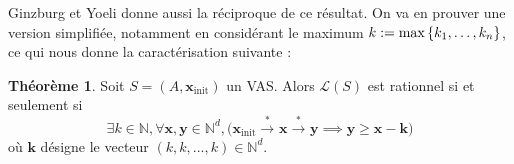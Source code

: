 \documentclass[a4paper,final]{article}
\theoremstyle{definition}
\newtheorem{Theorem}{Théorème}
\let\geq\geqslant
\newcommand{\os}[1]{\left\{\mathinner{#1}\right\}}
\newcommand{\N}{\ensuremath{\mathbb{N}}}
\newcommand{\lang}{\ensuremath{\mathcal{L}}}
\newcommand{\trans}[2]{\ensuremath{\stackrel{#1}{\longrightarrow}_{#2}}}
\newcommand{\vect}[1]{\ensuremath{\mathbf{#1}}}
\newcommand{\conf}[1]{\ensuremath{\mathcal{R}(#1)}}
\newcommand{\xinit}{\ensuremath{\vect{x}_\text{init}}}
\newcommand{\valeur}[1]{\ensuremath{\overline{#1}}}
\begin{document}
Ginzburg et Yoeli donne aussi la réciproque de ce résultat.
On va en prouver une version simplifiée, notamment en considérant le maximum $k:= \text{max}\os{k_1,\dots,k_n}$, ce qui nous donne la caractérisation suivante :




\begin{Theorem}
    Soit $S=(A,\xinit)$ un VAS.
    Alors $\lang(S)$ est rationnel si et seulement si
    \begin{equation}
        \exists k\in\N, \forall \vect{x},\vect{y}\in\N^d, 
\big( \xinit\trans{*}{} \vect{x} \trans{*}{} \vect{y}\implies
\vect{y}\geq \vect{x} -\vect{k} \big)
    \label{eq:caracterisation}
    \end{equation}
    où $\vect{k}$ désigne le vecteur $(k,k,...,k)\in\N^d$.
\end{Theorem}
\end{document}
